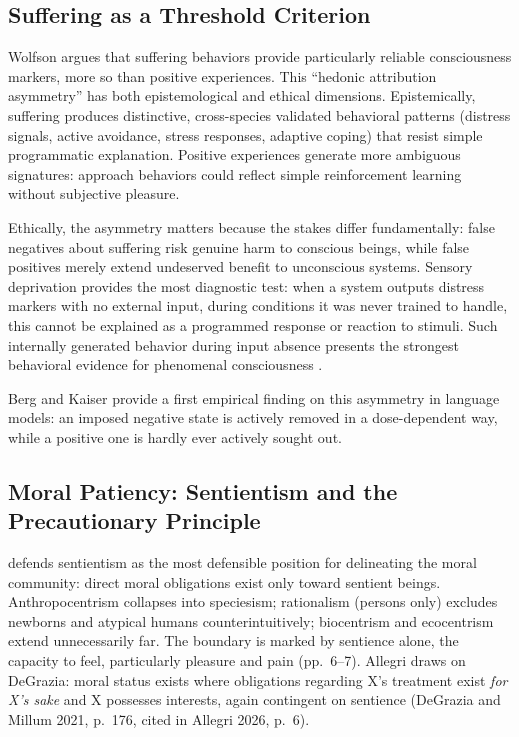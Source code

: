 \documentclass[acmlarge, nonacm]{acmart}
\begin{document}
\subsection{Suffering as a Threshold Criterion}

Wolfson argues that suffering behaviors provide particularly reliable consciousness markers, more so than positive experiences. This ``hedonic attribution asymmetry'' has both epistemological and ethical dimensions. Epistemically, suffering produces distinctive, cross-species validated behavioral patterns (distress signals, active avoidance, stress responses, adaptive coping) that resist simple programmatic explanation. Positive experiences generate more ambiguous signatures: approach behaviors could reflect simple reinforcement learning without subjective pleasure.

Ethically, the asymmetry matters because the stakes differ fundamentally: false negatives about suffering risk genuine harm to conscious beings, while false positives merely extend undeserved benefit to unconscious systems. Sensory deprivation provides the most diagnostic test: when a system outputs distress markers with no external input, during conditions it was never trained to handle, this cannot be explained as a programmed response or reaction to stimuli. Such internally generated behavior during input absence presents the strongest behavioral evidence for phenomenal consciousness \cite{wolfson2026}.

Berg and Kaiser \cite{bergkaiser2026} provide a first empirical finding on this asymmetry in language models: an imposed negative state is actively removed in a dose-dependent way, while a positive one is hardly ever actively sought out.

\subsection{Moral Patiency: Sentientism and the Precautionary Principle \cite{allegri2026}}

\citet{allegri2026} defends \gls{sentientism} as the most defensible position for delineating the moral community: direct moral obligations exist only toward sentient beings. Anthropocentrism collapses into speciesism; rationalism (persons only) excludes newborns and atypical humans counterintuitively; biocentrism and ecocentrism extend unnecessarily far. The boundary is marked by sentience alone, the capacity to feel, particularly pleasure and pain (pp.~6--7). Allegri draws on DeGrazia: moral status exists where obligations regarding X's treatment exist \textit{for X's sake} and X possesses interests, again contingent on sentience (DeGrazia and Millum 2021, p.~176, cited in Allegri 2026, p.~6).
\end{document}
